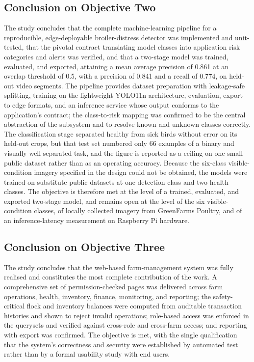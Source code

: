 \documentclass[12pt,a4paper]{report}
\begin{document}
\subsection{Conclusion on Objective Two}

The study concludes that the complete machine-learning pipeline for a reproducible, edge-deployable broiler-distress detector was implemented and unit-tested, that the pivotal contract translating model classes into application risk categories and alerts was verified, and that a two-stage model was trained, evaluated, and exported, attaining a mean average precision of 0.861 at an overlap threshold of 0.5, with a precision of 0.841 and a recall of 0.774, on held-out video segments. The pipeline provides dataset preparation with leakage-safe splitting, training on the lightweight YOLO11n architecture, evaluation, export to edge formats, and an inference service whose output conforms to the application's contract; the class-to-risk mapping was confirmed to be the central abstraction of the subsystem and to resolve known and unknown classes correctly. The classification stage separated healthy from sick birds without error on its held-out crops, but that test set numbered only 66 examples of a binary and visually well-separated task, and the figure is reported as a ceiling on one small public dataset rather than as an operating accuracy. Because the six-class visible-condition imagery specified in the design could not be obtained, the models were trained on substitute public datasets at one detection class and two health classes. The objective is therefore met at the level of a trained, evaluated, and exported two-stage model, and remains open at the level of the six visible-condition classes, of locally collected imagery from GreenFarms Poultry, and of an inference-latency measurement on Raspberry Pi hardware.

\subsection{Conclusion on Objective Three}

The study concludes that the web-based farm-management system was fully realised and constitutes the most complete contribution of the work. A comprehensive set of permission-checked pages was delivered across farm operations, health, inventory, finance, monitoring, and reporting; the safety-critical flock and inventory balances were computed from auditable transaction histories and shown to reject invalid operations; role-based access was enforced in the querysets and verified against cross-role and cross-farm access; and reporting with export was confirmed. The objective is met, with the single qualification that the system's correctness and security were established by automated test rather than by a formal usability study with end users.
\end{document}
